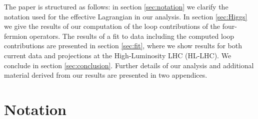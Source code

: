 \par 
The paper is structured as follows: in section \ref{sec:notation} we clarify the notation used for the effective Lagrangian in our analysis. In section \ref{sec:Higgs} we give the results of our computation of the loop contributions of the four-fermion operators. The results of a fit to data including the computed loop contributions are presented in section \ref{sec:fit}, 
where we show results for both current data and projections at the High-Luminosity LHC (HL-LHC).
We conclude in section \ref{sec:conclusion}. 
Further details of our analysis and additional material derived from our results are presented in two appendices.


\section{Notation \label{sec:notation}}

